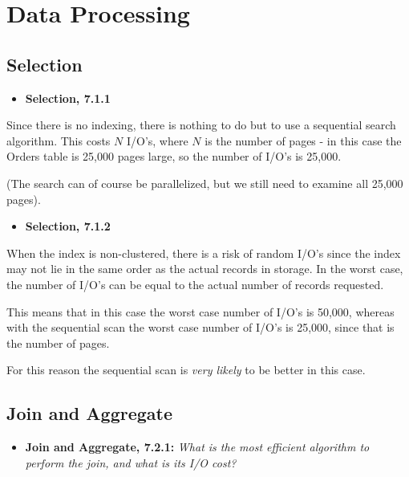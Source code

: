 \newpage
\section{Data Processing}

\subsection{Selection}


\begin{itemize}
  \item \textbf{Selection, 7.1.1}
\end{itemize}

Since there is no indexing, there is nothing to do but to use a sequential
search algorithm. This costs $N$ I/O's, where $N$ is the number of pages - in
this case the Orders table is 25,000 pages large, so the number of I/O's is
25,000.
\medskip

(The search can of course be parallelized, but we still need to examine all
25,000 pages).

\begin{itemize}
  \item \textbf{Selection, 7.1.2}
\end{itemize}

When the index is non-clustered, there is a risk of random I/O's since the index
may not lie in the same order as the actual records in storage. In the worst
case, the number of I/O's can be equal to the actual number of records
requested.
\smallskip

This means that in this case the worst case number of I/O's is 50,000, whereas
with the sequential scan the worst case number of I/O's is 25,000, since that is
the number of pages.
\medskip

For this reason the sequential scan is \emph{very likely} to be better in this
case.

\sectend

\subsection{Join and Aggregate}

\begin{itemize}
  \item \textbf{Join and Aggregate, 7.2.1:}
        \textit{What is the most efficient algorithm to perform the join, and
        what is its I/O cost?}
\end{itemize}

